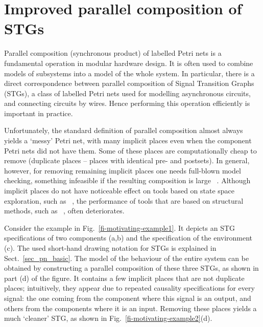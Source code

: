 \section{Improved parallel composition of STGs}\label{sec_intro}


Parallel composition (synchronous product) of labelled
Petri nets is a fundamental operation in modular hardware design. It is
often used to combine models of subsystems into a model of the
whole system. In particular, there is a direct correspondence
between parallel composition of Signal Transition Graphs
(STGs), a class of labelled Petri nets used for modelling
asynchronous circuits, and connecting circuits by wires. Hence
performing this operation efficiently is important in practice.

Unfortunately, the standard definition of parallel composition almost always yields a `messy' Petri net, with many implicit places even when the component Petri nets did not have them. Some of these places are computationally cheap to remove (\eg duplicate places -- places with identical pre- and postsets). In general, however, for removing remaining implicit places one needs full-blown model checking, something infeasible if the resulting composition is large ~\cite{Schaefer06strategiesfor}.
Although implicit places do not have noticeable effect on tools based on state space exploration, such as \petrify~\cite{ckkly97}, the performance of tools that are based on structural methods, such as \desij~\cite{Sch07}, often deteriorates.

Consider the example in Fig.~\ref{fi-motivating-example1}. It
depicts an STG specifications of two components (a,b) and
the specification of the environment (c). The used short-hand
drawing notation for STGs is explained in
Sect.~\ref{sec_pn_basic}. The model of the behaviour of the
entire system can be obtained by constructing a parallel
composition of these three STGs, as shown in part (d) of
the figure. It contains a few implicit places
that are not duplicate places; intuitively, they appear due
to repeated causality specifications for every signal: the one
coming from the component where this signal is an output, and
others from the components where it is an input. Removing
these places yields a much `cleaner' STG, as
shown in Fig.~\ref{fi-motivating-example2}(d).


